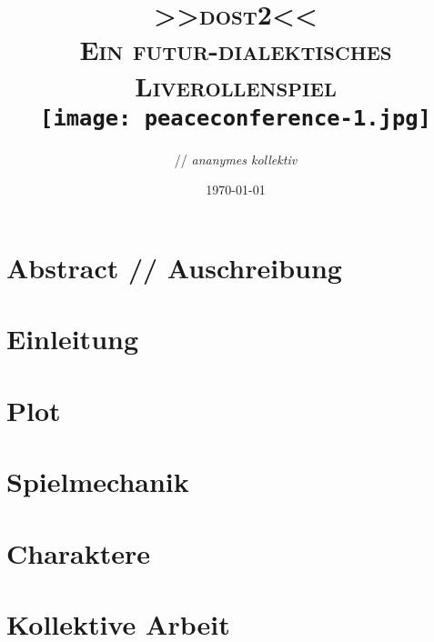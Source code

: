 \documentclass[12pt, a4paper, openany]{book}
\title{
  { \Large 
    \textbf{\textsc{>>\acs{dost2}<<}}\\
  }
  \vspace{0.4cm}
  { \large \color{gray}
    \textsc{Ein futur-dialektisches Liverollenspiel}
  }\\
  \vspace{2cm}
  {\texttt{[image: peaceconference-1.jpg]}}\\
  \vspace{1cm}
}
\author{\creators // \emph{ananymes kollektiv}}
\date{{\small \today}}
\begin{document}
\frontmatter

\begingroup
  \hypersetup{hidelinks}
  \maketitle
\endgroup

\chapter*{Abstract // Auschreibung}


\begingroup
  \hypersetup{hidelinks}
  \tableofcontents
\endgroup



\mainmatter
\chapter{Einleitung}


\chapter{Plot}


\chapter{Spielmechanik}


\chapter{Charaktere}


\chapter{Kollektive Arbeit}

\end{document}
